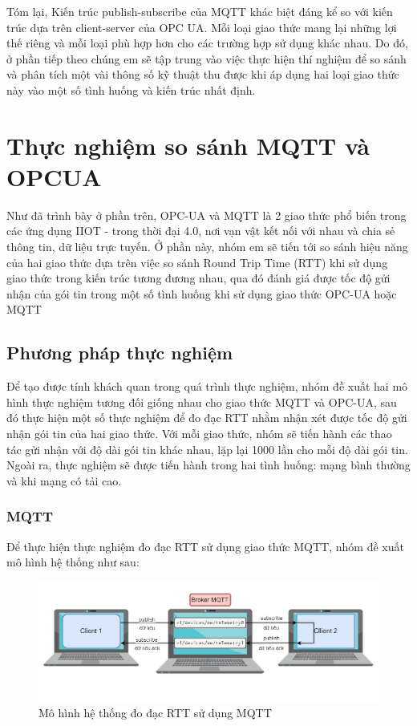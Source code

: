 Tóm lại, Kiến trúc publish-subscribe của MQTT khác biệt đáng kể so với kiến trúc dựa trên client-server của OPC UA. Mỗi loại giao thức mang lại những lợi thế riêng và mỗi loại phù hợp hơn cho các trường hợp sử dụng khác nhau. Do đó, ở phần tiếp theo chúng em sẽ tập trung vào việc thực hiện thí nghiệm để so sánh và phân tích một vài thông số kỹ thuật thu được khi áp dụng hai loại giao thức này vào một số tình huống và kiến trúc nhất định.

\section{Thực nghiệm so sánh MQTT và OPCUA}

Như đã trình bày ở phần trên, OPC-UA và MQTT là 2 giao thức phổ biến trong các ứng dụng IIOT - trong thời đại 4.0, nơi vạn vật kết nối với nhau và chia sẻ thông tin, dữ liệu trực tuyến. Ở phần này, nhóm em sẽ tiến tới so sánh hiệu năng của hai giao thức dựa trên việc so sánh Round Trip Time (RTT) khi sử dụng giao thức trong kiến trúc tương đương nhau, qua đó đánh giá được tốc độ gửi nhận của gói tin trong một số tình huống khi sử dụng giao thức OPC-UA hoặc MQTT

\subsection{Phương pháp thực nghiệm}

Để tạo được tính khách quan trong quá trình thực nghiệm, nhóm đề xuất hai mô hình thực nghiệm tương đối giống nhau cho giao thức MQTT và OPC-UA, sau đó thực hiện một số thực nghiệm để đo đạc RTT nhằm nhận xét được tốc độ gửi nhận gói tin của hai giao thức. Với mỗi giao thức, nhóm sẽ tiến hành các thao tác gửi nhận với độ dài gói tin khác nhau, lặp lại 1000 lần cho mỗi độ dài gói tin. Ngoài ra, thực nghiệm sẽ được tiến hành trong hai tình huống: mạng bình thường và khi mạng có tải cao.

\subsubsection{MQTT}

Để thực hiện thực nghiệm đo đạc RTT sử dụng giao thức MQTT, nhóm đề xuất mô hình hệ thống như sau:



\begin{figure}[!hp]
    \centering
    \includegraphics[width=\textwidth]{Images/Comparing_experiment/mqtt_testing_model.jpg}
    \caption{Mô hình hệ thống đo đạc RTT sử dụng MQTT}
    \label{fig:comp_mqtt}
\end{figure}

